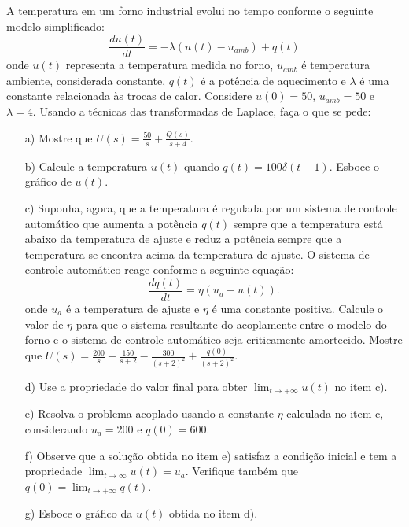 \begin{exer}A temperatura em um forno industrial evolui no tempo conforme o seguinte modelo simplificado:
\begin{equation}\frac{d u(t)}{dt}=-\lambda (u(t)-u_{amb}) + q(t)\end{equation}
onde $u(t)$ representa a temperatura medida no forno, $u_{amb}$ é temperatura ambiente, considerada constante, $q(t)$ é a potência de aquecimento e $\lambda$ é uma constante relacionada às trocas de calor. Considere $u(0)=50$, $u_{amb}=50$ e $\lambda=4$. Usando a técnicas das transformadas de Laplace, faça o que se pede:
\begin{itemize}
 \item [a)] Mostre que $U(s)=\frac{50}{s}+\frac{Q(s)}{s+4}$.
 \item [b)] Calcule a temperatura $u(t)$ quando  $q(t)=100 \delta(t-1)$. Esboce o gráfico de $u(t)$.
 \item [c)] Suponha, agora, que a temperatura é regulada por um sistema de controle automático que aumenta a potência $q(t)$ sempre que a temperatura está abaixo da temperatura de ajuste e reduz a potência sempre que a temperatura se encontra acima da temperatura de ajuste. O sistema de controle automático reage conforme a seguinte equação:
 \begin{equation}\frac{dq(t)}{dt} = \eta (u_a-u(t)).\end{equation}
 onde $u_a$ é a temperatura de ajuste e $\eta$ é uma constante positiva. Calcule o valor de $\eta$ para que o sistema resultante do acoplamente entre o modelo do forno e o sistema de controle automático seja criticamente amortecido. Mostre que $U(s)=\frac{200}{s}-\frac{150}{s+2}-\frac{300}{(s+2)^2}+\frac{q(0)}{(s+2)^2}$.
 \item[d)] Use a propriedade do valor final para obter $\displaystyle\lim_{t\to+\infty} u(t)$ no item c).
 \item[e)] Resolva o problema acoplado usando a constante $\eta$ calculada no item c, considerando $u_a=200$ e $q(0)=600$.
  \item[f)] Observe que a solução obtida no item e) satisfaz a condição inicial e tem a propriedade $\displaystyle\lim_{t\to \infty}u(t)=u_a$. Verifique também que $q(0)=\lim_{t\to+\infty} q(t)$.
 \item [g)] Esboce o gráfico da $u(t)$ obtida no item d).
 \end{itemize}
\end{exer}
